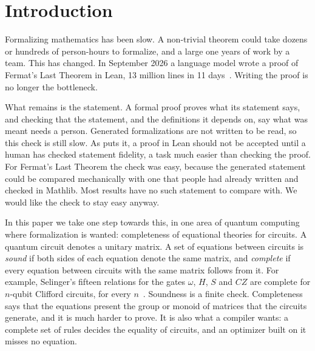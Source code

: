 \section{Introduction}\label{sec:intro}

Formalizing mathematics has been slow. A non-trivial theorem could take
dozens or hundreds of person-hours to formalize, and a large one years
of work by a team. This has changed. In September 2026 a language model
wrote a proof of Fermat's Last Theorem in Lean, 13 million lines in 11
days~\cite{anthropic2026flt}. Writing the proof is no longer the
bottleneck.

What remains is the statement. A formal proof proves what its statement
says, and checking that the statement, and the definitions it depends
on, say what was meant needs a person. Generated formalizations are not
written to be read, so this check is still slow. As
\citet{hales2026reliability} puts it, a proof in Lean should not be
accepted until a human has checked statement fidelity, a task much
easier than checking the proof. For Fermat's Last Theorem the check was
easy, because the generated statement could be compared mechanically
with one that people had already written and checked in Mathlib. Most
results have no such statement to compare with. We would like the
check to stay easy anyway.

In this paper we take one step towards this, in one area of quantum
computing where formalization is wanted: completeness of equational
theories for circuits. A quantum circuit denotes a unitary matrix. A
set of equations between circuits is \emph{sound} if both sides of
each equation denote the same matrix, and \emph{complete} if every
equation between circuits with the same matrix follows from it. For
example, Selinger's fifteen relations for the gates $\omega$, $H$, $S$
and $CZ$ are complete for $n$-qubit Clifford circuits, for every
$n$~\cite{selinger2015clifford}. Soundness is a finite check.
Completeness says that the equations present the group or monoid of
matrices that the circuits generate, and it is much harder to prove.
It is also what a compiler wants: a complete set of rules decides the
equality of circuits, and an optimizer built on it misses no
equation.

